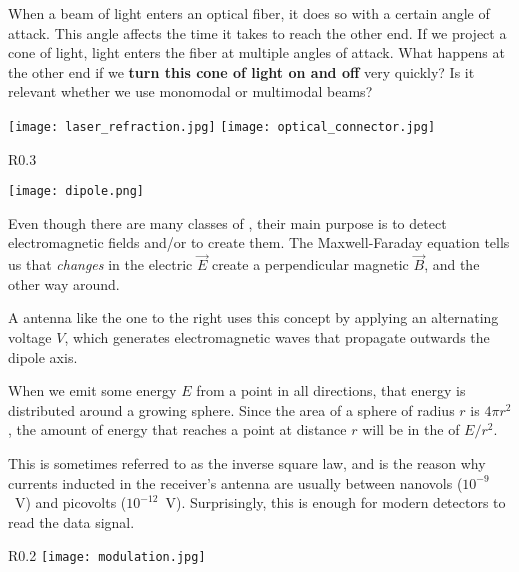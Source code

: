 \begin{exercise}\label{ex:piercing:laser_refraction}
When a beam of light enters an optical fiber, it does so with a certain angle of attack.
This angle affects the time it takes to reach the other end. If we project a cone of light,
light enters the fiber at multiple angles of attack. 
What happens at the other end if we \textbf{turn this cone of light on and off} very quickly?
Is it relevant whether we use monomodal or multimodal beams?
% 
\begin{center}
\texttt{[image: laser\_refraction.jpg]}
\texttt{[image: optical\_connector.jpg]}
\end{center}
\end{exercise}
\newpage

\begin{wrapfigure}{R}{0.3\linewidth}
\begin{center}
\texttt{[image: dipole.png]}
\end{center}
\end{wrapfigure}

Even though there are many classes of , their main purpose 
is to detect electromagnetic fields and/or to create them. The Maxwell-Faraday equation tells us
that \textit{changes} in the electric  $\vec{E}$ create a perpendicular magnetic  $\vec{B}$,
and the other way around.

A  antenna like the one to the right uses this concept by applying an alternating voltage $V$,
which generates electromagnetic waves that propagate outwards the dipole axis. 

\begin{remark}
When we emit some energy $E$ from a point in all directions, that energy is distributed around a growing sphere.
Since the area of a sphere of radius $r$ is $4 \pi r^2$, the amount of energy that reaches a point at distance $r$
will be in the  of $E / r^2$.

This is sometimes referred to as the inverse square law, and is
the reason why currents inducted in the receiver's antenna are usually between nanovols 
($10^{-9}$~V) and picovolts ($10^{-12}$~V). Surprisingly, this is enough for modern detectors to read the data signal.
\end{remark}


\begin{wrapfigure}{R}{0.2\linewidth}
 \texttt{[image: modulation.jpg]}
\end{wrapfigure}



